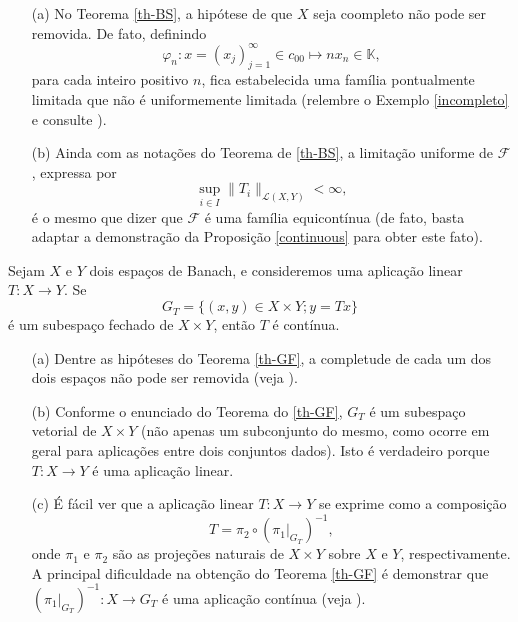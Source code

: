 \begin{remark}
\begin{itemize}
\item[(a)] No Teorema \ref{th-BS}, a hipótese de que $X$ seja coompleto não pode ser removida. De fato, definindo 
\[
\displaystyle \varphi_n : x=(x_j)_{j=1}^{\infty} \in c_{00} \longmapsto nx_n \in \mathbb K ,
\]
para cada inteiro positivo $n$, fica estabelecida uma família pontualmente limitada que não é uniformemente limitada (relembre o Exemplo \ref{incompleto} e consulte \cite{pombo1999introduccao}).
\item[(b)] Ainda com as notações do Teorema de \ref{th-BS}, a limitação uniforme de $\mathcal F$, expressa por 
\[
\sup_{i\in I}\|T_i\|_{\mathcal{L}(X,Y)}<\infty ,
\]
é o mesmo que dizer que $\mathcal F$ é uma família equicontínua (de fato, basta adaptar a demonstração da Proposição \ref{continuous} para obter este fato).
\end{itemize}
\end{remark}

\begin{theorem}\label{th-GF}
    Sejam $X$ e $Y$ dois espaços de Banach, e consideremos uma aplicação linear $T:X\longrightarrow Y$. Se
    \[
    \displaystyle G_T = \{ (x,y)\in X\times Y; y=Tx\}
    \]
    é um subespaço fechado de $X\times Y$, então $T$ é contínua.
\end{theorem}

\begin{remark}
    \begin{itemize}
    \item[(a)] Dentre as hipóteses do Teorema \ref{th-GF}, a completude de cada um dos dois espaços não pode ser removida (veja \cite{pombo1999introduccao}).
    \item[(b)] Conforme o enunciado do Teorema do \ref{th-GF}, $G_T$ é um subespaço vetorial de $X\times Y$ (não apenas um subconjunto do mesmo, como ocorre em geral para aplicações entre dois conjuntos dados). Isto é verdadeiro porque $T:X\longrightarrow Y$ é uma aplicação linear. 
    \item[(c)] É fácil ver que a aplicação linear $T:X\longrightarrow Y$ se exprime como a composição
    \[
    T=\pi_2 \circ (\pi_1 |_{G_T})^{-1},
    \]
    onde $\pi_1$ e $\pi_2$ são as projeções naturais de $X\times Y$ sobre $X$ e $Y$, respectivamente. A principal dificuldade na obtenção do Teorema \ref{th-GF} é demonstrar que $(\pi_1 |_{G_T})^{-1}: X\longrightarrow G_T$ é uma aplicação contínua (veja \cite{pombo1999introduccao}).
    \end{itemize}
\end{remark}

